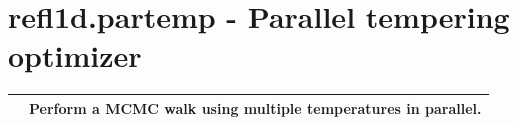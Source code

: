 \documentclass[letterpaper,10pt,english]{sphinxmanual}
\begin{document}
\begin{fulllineitems}
\label{api/numpyerrors:refl1d.numpyerrors.errors}
\end{fulllineitems}


\begin{fulllineitems}
\label{api/numpyerrors:refl1d.numpyerrors.ignored}
\end{fulllineitems}


\begin{fulllineitems}
\label{api/numpyerrors:refl1d.numpyerrors.printed}
\end{fulllineitems}


\begin{fulllineitems}
\label{api/numpyerrors:refl1d.numpyerrors.raised}
\end{fulllineitems}


\begin{fulllineitems}
\label{api/numpyerrors:refl1d.numpyerrors.warned}
\end{fulllineitems}



\section{refl1d.partemp - Parallel tempering optimizer}
\label{api/partemp::doc}\label{api/partemp:refl1d-partemp-parallel-tempering-optimizer}
\begin{tabulary}{\linewidth}{LL}
\hline

{\hyperref[api/partemp:refl1d.partemp.parallel_tempering]{}}
 & 
Perform a MCMC walk using multiple temperatures in parallel.
\\
\hline
\end{tabulary}
\end{document}
